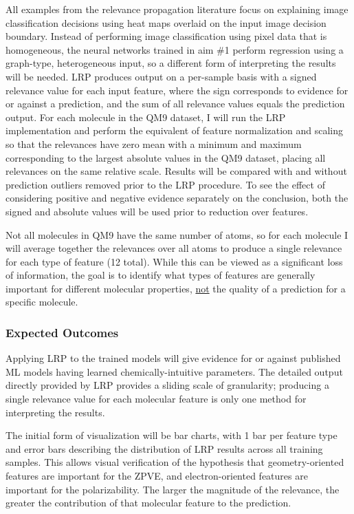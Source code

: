 \documentclass[12pt]{article}
\begin{document}
All examples from the relevance propagation literature focus on explaining image classification decisions using heat maps overlaid on the input image decision boundary. Instead of performing image classification using pixel data that is homogeneous, the neural networks trained in aim \#1 perform regression using a graph-type, heterogeneous input, so a different form of interpreting the results will be needed. LRP produces output on a per-sample basis with a signed relevance value for each input feature, where the sign corresponds to evidence for or against a prediction, and the sum of all relevance values equals the prediction output. For each molecule in the QM9 dataset, I will run the LRP implementation and perform the equivalent of feature normalization and scaling so that the relevances have zero mean with a minimum and maximum corresponding to the largest absolute values in the QM9 dataset, placing all relevances on the same relative scale. Results will be compared with and without prediction outliers removed prior to the LRP procedure. To see the effect of considering positive and negative evidence separately on the conclusion, both the signed and absolute values will be used prior to reduction over features.

Not all molecules in QM9 have the same number of atoms, so for each molecule I will average together the relevances over all atoms to produce a single relevance for each type of feature (12 total). While this can be viewed as a significant loss of information, the goal is to identify what types of features are generally important for different molecular properties, \uline{not} the quality of a prediction for a specific molecule.

\subsubsection{Expected Outcomes}
\label{sec:org260ecec}

Applying LRP to the trained models will give evidence for or against published ML models having learned chemically-intuitive parameters. The detailed output directly provided by LRP provides a sliding scale of granularity; producing a single relevance value for each molecular feature is only one method for interpreting the results.

The initial form of visualization will be bar charts, with 1 bar per feature type and error bars describing the distribution of LRP results across all training samples. This allows visual verification of the hypothesis that geometry-oriented features are important for the ZPVE, and electron-oriented features are important for the polarizability. The larger the magnitude of the relevance, the greater the contribution of that molecular feature to the prediction.
\end{document}

